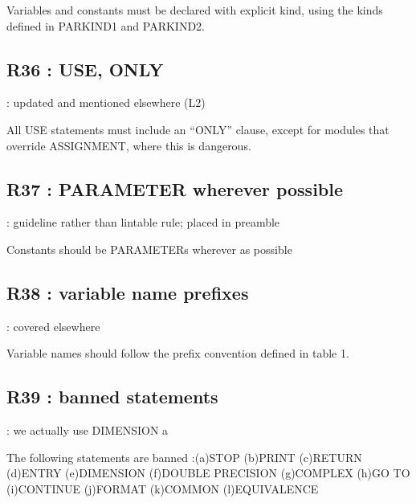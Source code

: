 \documentclass[letterpaper,10pt,english]{sphinxmanual}
\begin{document}
\sphinxAtStartPar
Variables and constants must be declared with explicit kind, using the kinds defined
in PARKIND1 and PARKIND2.

\sphinxstepscope


\subsection{R36 :  USE, ONLY}
\label{\detokenize{obsolescent/r36:r36-use-only}}\label{\detokenize{obsolescent/r36::doc}}
\sphinxAtStartPar
{} : updated and mentioned elsewhere (L2)

\sphinxAtStartPar
All USE statements must include an “ONLY” clause, except for modules that override ASSIGNMENT,
where this is dangerous.

\sphinxstepscope


\subsection{R37 : PARAMETER wherever possible}
\label{\detokenize{obsolescent/r37:r37-parameter-wherever-possible}}\label{\detokenize{obsolescent/r37::doc}}
\sphinxAtStartPar
{} : guideline rather than lintable rule; placed in preamble

\sphinxAtStartPar
Constants should be PARAMETERs wherever as possible

\sphinxstepscope


\subsection{R38 :  variable name prefixes}
\label{\detokenize{obsolescent/r38:r38-variable-name-prefixes}}\label{\detokenize{obsolescent/r38::doc}}
\sphinxAtStartPar
{} : covered elsewhere

\sphinxAtStartPar
Variable names should follow the prefix convention defined in table 1.

\sphinxstepscope


\subsection{R39 :  banned statements}
\label{\detokenize{obsolescent/r39:r39-banned-statements}}\label{\detokenize{obsolescent/r39::doc}}
\sphinxAtStartPar
{} : we actually use DIMENSION a 

\sphinxAtStartPar
The following statements are banned :(a)STOP (b)PRINT (c)RETURN (d)ENTRY (e)DIMENSION (f)DOUBLE PRECISION (g)COMPLEX
(h)GO TO (i)CONTINUE (j)FORMAT (k)COMMON (l)EQUIVALENCE
\end{document}

